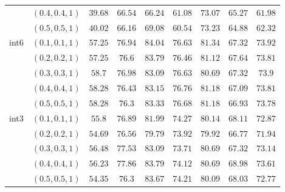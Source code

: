\begin{table*}[h!]
{\begin{tabular}{@{}ccccccccc@{}}
&$(0.4,0.4,1)$ & $39.68$ & $66.54$ & $66.24$ & $61.08$ & $73.07$ & $65.27$ & $61.98$ \\
&$(0.5,0.5,1)$ & $40.02$ & $66.16$ & $69.08$ & $60.54$ & $73.23$ & $64.88$ & $62.32$ \\ \midrule \midrule
\multirow{5}{*}{int6} & $(0.1,0.1,1)$ & $57.25$ & $76.94$ & $84.04$ & $76.63$ & $81.34$ & $67.32$ & $73.92$ \\
& $(0.2,0.2,1)$ & $57.25$ & $76.6$  & $83.79$ & $76.46$ & $81.12$ & $67.64$ & $73.81$ \\
& $(0.3,0.3,1)$ & $58.7$  & $76.98$ & $83.09$ & $76.63$ & $80.69$ & $67.32$ & $73.9$  \\
& $(0.4,0.4,1)$ & $58.28$ & $76.43$ & $83.15$ & $76.76$ & $81.18$ & $67.09$ & $73.81$ \\
& $(0.5,0.5,1)$ & $58.28$ & $76.3$  & $83.33$ & $76.68$ & $81.18$ & $66.93$ & $73.78$  \\
 \midrule

                       \multirow{5}{*}{int3} & $(0.1,0.1,1)$ & $55.8$  & $76.89$ & $81.99$ & $74.27$ & $80.14$ & $68.11$ & $72.87$ \\
&$(0.2,0.2,1)$ & $54.69$ & $76.56$ & $79.79$ & $73.92$ & $79.92$ & $66.77$ & $71.94$ \\
&$(0.3,0.3,1)$ & $56.48$ & $77.53$ & $83.09$ & $73.71$ & $80.69$ & $67.32$ & $73.14$ \\
&$(0.4,0.4,1)$ & $56.23$ & $77.86$ & $83.79$ & $74.12$ & $80.69$ & $68.98$ & $73.61$ \\
&$(0.5,0.5,1)$ & $54.35$ & $76.3$  & $83.67$ & $74.21$ & $80.09$ & $68.03$ & $72.77$  \\\bottomrule
\end{tabular}
}
\end{table*}

